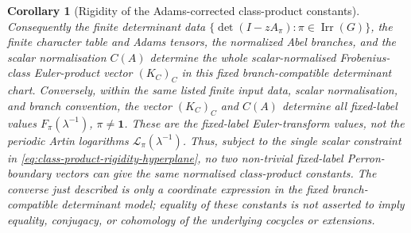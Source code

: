 \documentclass[11pt,a4paper]{amsart}
\theoremstyle{plain}
\newtheorem{corollary}[theorem]{Corollary}
\theoremstyle{definition}
\theoremstyle{remark}
\DeclareMathOperator{\Irr}{Irr}
\begin{document}
\begin{corollary}[Rigidity of the Adams-corrected class-product constants]
  Consequently the finite determinant data
  \(\{\det(I-zA_\pi):\pi\in\Irr(G)\}\), the finite character table and
  Adams tensors, the normalized Abel branches, and the scalar normalisation
  \(C(A)\) determine the whole scalar-normalised Frobenius-class Euler-product
  vector \((K_C)_C\) in this fixed branch-compatible determinant chart.
  Conversely, within the same listed finite input data, scalar normalisation,
  and branch convention, the vector \((K_C)_C\) and \(C(A)\) determine all
  fixed-label values \(F_\pi(\lambda^{-1})\), \(\pi\neq\mathbf1\). These are the
  fixed-label Euler-transform values, not the periodic Artin logarithms
  \(\mathcal L_\pi(\lambda^{-1})\). Thus, subject to the single scalar
  constraint in \eqref{eq:class-product-rigidity-hyperplane}, no two
  non-trivial fixed-label Perron-boundary vectors can give the same
  normalised class-product constants.  The converse just described is only
  a coordinate expression in the fixed branch-compatible determinant model;
  equality of these
  constants is not asserted to imply equality, conjugacy, or cohomology of
  the underlying cocycles or extensions.
\end{corollary}
\end{document}
